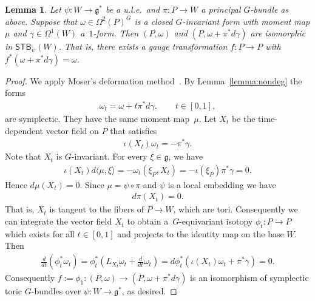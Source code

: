 \documentclass[10pt,a4paper]{amsart}
\numberwithin{equation}{section}
\newtheorem{Lemma}{Lemma}[section]
\begin{document}
\begin{Lemma} \label{unique omega}
Let $\psi\colon W\to {\mathfrak g}^*$ be a u.l.e.\
  and $\pi \colon  P\xrightarrow{}W$ a principal $G$-bundle as above.
  Suppose that $\omega\in \Omega^2(P)^G$ is a closed $G$-invariant form with
  moment map $\mu$ and $\gamma\in \Omega^1 (W)$ a~$1$-form.  Then
  $(P,\omega)$ and $(P,\omega + \pi^* d\gamma)$ are isomorphic in
  ${\textsf{STB}}_\psi (W)$.  That is, there exists a gauge transformation
  $f\colon P\to P$ with $f^*(\omega + \pi^* d\gamma) = \omega$.
\end{Lemma}

\begin{proof}
We apply Moser's deformation method~\cite{moser}.  By Lemma~\ref{lemma:nondeg}
the forms
\begin{gather*}
\omega_t = \omega + t \pi^* d\gamma, \qquad t\in [0,1],
\end{gather*}
are symplectic. They have  the same moment map~$\mu$.
Let $X_t$ be the time-dependent vector f\/ield on $P$ that satisf\/ies
\begin{gather*}
\iota(X_t)\omega_t = - \pi^* \gamma.
\end{gather*}
Note that $X_t$ is $G$-invariant.
For every $\xi \in {\mathfrak g}$, we have
\begin{gather*}
\iota(X_t) d\langle \mu, \xi\rangle = -\omega_t(\xi_P,X_t) =
 - \iota(\xi_P) \pi^* \gamma =0.
\end{gather*}
Hence $d \mu ( X_t) = 0$. Since  $\mu = \psi \circ \pi$
and $\psi$ is a local embedding we have
\begin{gather*}
d \pi  (X_t) = 0.
\end{gather*}
That is, $X_t$ is tangent to the f\/ibers of $P\to W$, which
are tori.
Consequently we can integrate the vector f\/ield $X_t$ to obtain a~$G$-equivariant isotopy $\phi_t \colon P\to P$ which exists for all
$t\in [0,1]$
and projects to the identity map on the base $W$.  Then
\begin{gather*}
\frac{d}{dt} (\phi_t^* \omega_t)
 = \phi_t^* \left( L_{X_t} \omega_t + \frac{d}{dt} \omega_t\right)
 = d \phi_t^* (\iota(X_t) \omega_t + \pi^* \gamma) = 0.
\end{gather*}
Consequently $f := \phi_1\colon (P,\omega)\to (P,\omega + \pi^* d\gamma)$ is
an isomorphism of symplectic toric $G$-bundles over $\psi\colon W\to {\mathfrak g}^*$,
as desired.
\end{proof}
\end{document}
